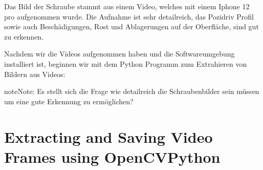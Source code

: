 \documentclass[letterpaper,10pt,english]{jupyterBook}
\begin{document}
\sphinxAtStartPar
Das Bild der Schraube stammt aus einem Video, welches mit einem Iphone 12 pro aufgenommen wurde. Die Aufnahme ist sehr detailreich, das Pozidriv Profil sowie auch Beschädigungen, Rost und Ablagerungen auf der Oberfläche, sind gut zu erkennen.

\sphinxAtStartPar
Nachdem wir die Videos aufgenommen haben und die Softwareumgebung installiert ist, beginnen wir mit dem Python Programm zum Extrahieren von Bildern aus Videos:

\begin{sphinxadmonition}{note}{Note:}
\sphinxAtStartPar
Es stellt sich die Frage wie detailreich die Schraubenbilder sein müssen um eine gute Erkennung zu ermöglichen?
\end{sphinxadmonition}


\section{Extracting and Saving Video Frames using OpenCV\sphinxhyphen{}Python}
\label{\detokenize{01_Bilderdatenbank/video2frames:extracting-and-saving-video-frames-using-opencv-python}}
\end{document}
